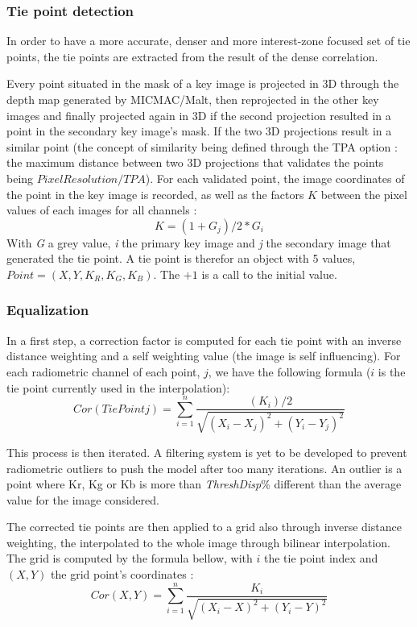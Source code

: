 \subsubsection{Tie point detection}

In order to have a more accurate, denser and more interest-zone focused set of tie points, the tie points are extracted from the result of the dense correlation.


 Every point situated in the mask of a key image is projected in 3D through the depth map generated by MICMAC/Malt, then reprojected in the other key images and finally projected again in 3D if the second projection resulted in a point in the secondary key image's mask. If the two 3D projections result in a similar point (the concept of similarity being defined through the TPA option : the maximum distance between two 3D projections that validates the points being $PixelResolution/TPA$). For each validated point, the image coordinates of the point in the key image is recorded, as well as the factors $K$ between the pixel values of each images for all channels : \[K=(1+G_{j})/2*G_{i}\]
 With \textit{G} a grey value, \textit{i} the primary key image and \textit{j} the secondary image that generated the tie point. A tie point is therefor an object with 5 values, $Point=(X,Y,K_{R},K_{G},K_{B})$. The $+1$ is a call to the initial value.

\subsubsection{Equalization}

In a first step, a correction factor is computed for each tie point with an inverse distance weighting and a self weighting value (the image is self influencing). For each radiometric channel of each point, $j$, we have the following formula ($i$ is the tie point currently used in the interpolation):
\[Cor(TiePointj)=\sum_{i=1}^{n} \frac{(K_{i})/2}{\sqrt{(X_{i}-X_{j})^2+(Y_{i}-Y_{j})^2}}\]

This process is then iterated. A filtering system is yet to be developed to prevent radiometric outliers to push the model after too many iterations. An outlier is a point where Kr, Kg or Kb is more than \textit{ThreshDisp}\% different than the average value for the image considered.


The corrected tie points are then applied to a grid also through inverse distance weighting, the interpolated to the whole image through bilinear interpolation. The grid is computed by the formula bellow, with $i$ the tie point index and $(X,Y)$ the grid point's coordinates : \[Cor(X,Y)=\sum_{i=1}^{n} \frac{K_{i}}{\sqrt{(X_{i}-X)^2+(Y_{i}-Y)^2}}\]

